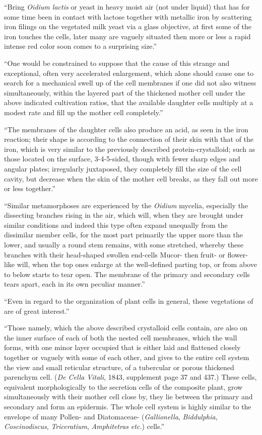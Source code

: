 \documentclass[a4paper, 12pt, oneside]{article}
\begin{document}
``Bring \emph{Oidium lactis} or yeast in heavy moist air (not under liquid) that has for some time been in contact with lactose together with metallic iron by scattering iron filings on the vegetated milk yeast via a glass objective, at first some of the iron touches the cells, later many are vaguely situated then more or less a rapid intense red color soon comes to a surprising size.''

``One would be constrained to suppose that the cause of this strange and exceptional, often very accelerated enlargement, which alone should cause one to search for a mechanical swell up of the cell membranes if one did not also witness simultaneously, within the layered part of the thickened mother cell under the above indicated cultivation ratios, that the available daughter cells multiply at a modest rate and fill up the mother cell completely.''

``The membranes of the daughter cells also produce an acid, as seen in the iron reaction; their shape is according to the connection of their skin with that of the iron, which is very similar to the previously described protein-crystalloid; such as those located on the surface, 3-4-5-sided, though with fewer sharp edges and angular plates; irregularly juxtaposed, they completely fill the size of the cell cavity, but decrease when the skin of the mother cell breaks, as they fall out more or less together.''

``Similar metamorphoses are experienced by the \emph{Oidium} mycelia, especially the dissecting branches rising in the air, which will, when they are brought under similar conditions and indeed this type often expand unequally from the dissimilar member cells, for the most part primarily the upper more than the lower, and usually a round stem remains, with some stretched, whereby these branches with their head-shaped swollen end-cells Mucor- then fruit- or flower-like will, when the top ones enlarge at the well-defined parting top, or from above to below starts to tear open. The membrane of the primary and secondary cells tears apart, each in its own peculiar manner.''

``Even in regard to the organization of plant cells in general, these vegetations of are of great interest.''

``Those namely, which the above described crystalloid cells contain, are also on the inner surface of each of both the nested cell membranes, which the wall forms, with one minor layer occupied that is either laid and flattened closely together or vaguely with some of each other, and gives to the entire cell system the view and small reticular structure, of a tubercular or porous thickened parenchym cell. (\emph{De Cella Vitali}, 1843, supplement page 37 and 437.) These cells, equivalent morphologically to the secretion cells of the composite plant, grow simultaneously with their mother cell close by, they lie between the primary and secondary and form an epidermis. The whole cell system is highly similar to the envelope of many Pollen- and Diatomaceae- (\emph{Gallionella}, \emph{Biddulphia}, \emph{Coscinodiscus}, \emph{Triceratium}, \emph{Amphitetras} \emph{etc.}) cells.''
\end{document}
